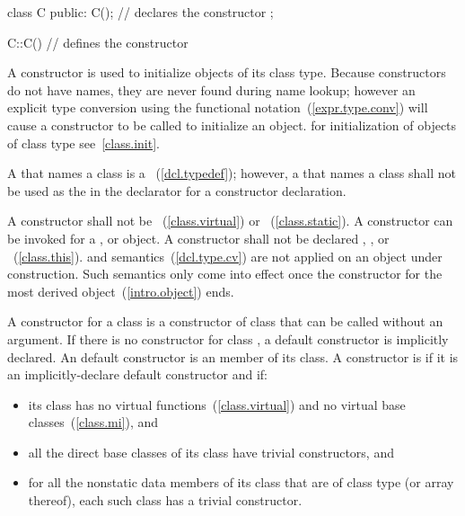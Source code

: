 \begin{codeblock}
class C {
public:
	C();			// declares the constructor
};

C::C() { }			// defines the constructor
\end{codeblock}
\exitexampleb

\pnum
A constructor is used to initialize objects of its class type.
Because constructors do not have names, they are never found during
name lookup; however an explicit type conversion using the functional
notation~(\ref{expr.type.conv}) will cause a constructor to be called to
initialize an object.
\enternote
for initialization of objects of class type see~\ref{class.init}.
\exitnote

\pnum
A
that names a class is a
~(\ref{dcl.typedef}); however, a
 that names a class shall not be used as the
in the declarator for a constructor declaration.

\pnum
A constructor shall not be
~(\ref{class.virtual}) or
~(\ref{class.static}).
%
%
A constructor can be invoked for a
,
or
object.
%
A constructor shall not be declared
,
,
or
~(\ref{class.this}).
and
semantics~(\ref{dcl.type.cv}) are not applied on an object under construction.
Such semantics only come into effect once the constructor for the
most derived object~(\ref{intro.object}) ends.

\pnum
{}%
%
%
A
constructor for a class
is a constructor of class
that can be called without an argument.
%
If there is no  constructor for class
,
a default constructor is implicitly declared.
An  default constructor is an
member of its class.
A constructor is  if it is an implicitly-declare default
constructor and if:

\begin{itemize}
\item
its class has no virtual functions~(\ref{class.virtual}) and no virtual base
classes~(\ref{class.mi}), and

\item
all the direct base classes of its class have trivial constructors, and

\item
for all the nonstatic data members of its class that are of class
type (or array thereof), each such class has a trivial constructor.
\end{itemize}

